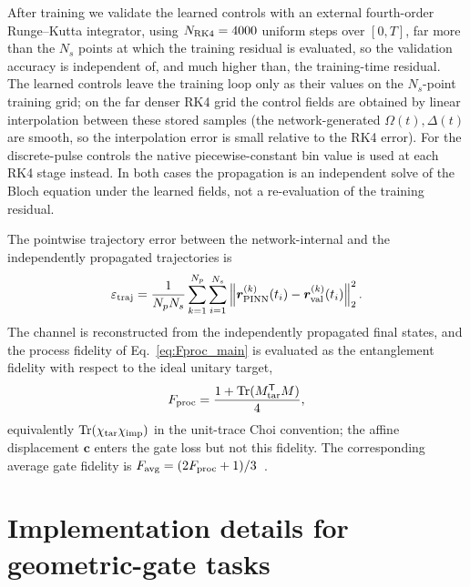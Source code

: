 \documentclass[aps,prx,reprint,superscriptaddress,nofootinbib,longbibliography,floatfix,showkeys]{revtex4-2}
\newcommand{\rr}{\bm r}
\newcommand{\Mtar}{M_{\rm tar}}
\begin{document}
After training we validate the learned controls with an external fourth-order Runge--Kutta integrator, using $N_{\rm RK4}=4000$ uniform steps over $[0,T]$, far more than the $N_s$ points at which the training residual is evaluated, so the validation accuracy is independent of, and much higher than, the training-time residual.  The learned controls leave the training loop only as their values on the $N_s$-point training grid; on the far denser RK4 grid the control fields are obtained by linear interpolation between these stored samples (the network-generated $\Omega(t),\Delta(t)$ are smooth, so the interpolation error is small relative to the RK4 error).  For the discrete-pulse controls the native piecewise-constant bin value is used at each RK4 stage instead.  In both cases the propagation is an independent solve of the Bloch equation under the learned fields, not a re-evaluation of the training residual.

The pointwise trajectory error between the network-internal and the independently propagated trajectories is
\begin{equation}
    \varepsilon_{\rm traj}=\frac{1}{N_pN_s}
    \sum_{k=1}^{N_p}\sum_{i=1}^{N_s}
    \left\|\rr_{\rm PINN}^{(k)}(t_i)-\rr_{\rm val}^{(k)}(t_i)\right\|_2^2.
\end{equation}
The channel is reconstructed from the independently propagated final states, and the process fidelity of Eq.~\eqref{eq:Fproc_main} is evaluated as the entanglement fidelity with respect to the ideal unitary target,
\begin{equation}
    F_{\rm proc}=\frac{1+\operatorname{Tr}(\Mtar^{\mathsf T}M)}{4},
    \label{eq:fproc_ptm_supp}
\end{equation}
equivalently $\operatorname{Tr}(\chi_{\rm tar}\chi_{\rm imp})$ in the unit-trace Choi convention; the affine displacement $\bm c$ enters the gate loss but not this fidelity.  The corresponding average gate fidelity is $F_{\rm avg}=(2F_{\rm proc}+1)/3$~\cite{Nielsen2002AverageGateFidelity}.


\section{Implementation details for geometric-gate tasks}
\label{supp:geometry}
\end{document}
